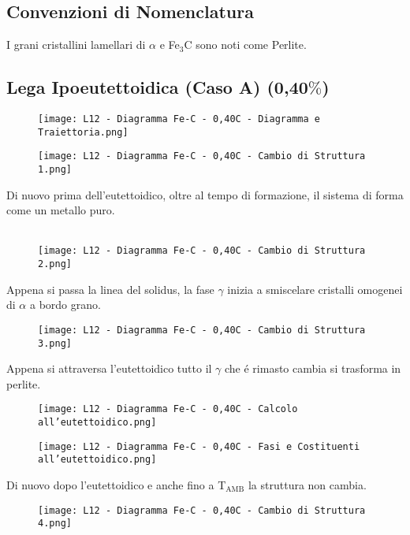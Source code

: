 \documentclass{article}
\begin{document}
{        \subsection{Convenzioni di Nomenclatura}
            I grani cristallini lamellari di $\alpha$ e Fe$_3$C sono noti come Perlite.
        \newpage
        \subsection{Lega Ipoeutettoidica (Caso A) (0,40$\%$)}
            \begin{figure}[h!]
                \centering
                \texttt{[image: L12 - Diagramma Fe-C - 0,40C - Diagramma e Traiettoria.png]}
            \end{figure}
            \begin{figure}[h!]
                \centering
                \texttt{[image: L12 - Diagramma Fe-C - 0,40C - Cambio di Struttura 1.png]}
            \end{figure}
            Di nuovo prima dell'eutettoidico, oltre al tempo di formazione, il sistema di forma come un metallo puro.\\ \\
            \newpage
            \begin{figure}[h!]
                \centering
                \texttt{[image: L12 - Diagramma Fe-C - 0,40C - Cambio di Struttura 2.png]}
            \end{figure}
            Appena si passa la linea del solidus, la fase $\gamma$ inizia a smiscelare cristalli omogenei di $\alpha$ a bordo grano.
            \begin{figure}[h!]
                \centering
                \texttt{[image: L12 - Diagramma Fe-C - 0,40C - Cambio di Struttura 3.png]}
            \end{figure}
            Appena si attraversa l'eutettoidico tutto il $\gamma$ che \'e rimasto cambia si trasforma in perlite.
            \begin{figure}[h!]
                \centering
                \texttt{[image: L12 - Diagramma Fe-C - 0,40C - Calcolo all'eutettoidico.png]}
            \end{figure}
            \begin{figure}[h!]
                \centering
                \texttt{[image: L12 - Diagramma Fe-C - 0,40C - Fasi e Costituenti all'eutettoidico.png]}
            \end{figure}
            Di nuovo dopo l'eutettoidico e anche fino a T$_\text{AMB}$ la struttura non cambia.
            \begin{figure}[h!]
                \centering
                \texttt{[image: L12 - Diagramma Fe-C - 0,40C - Cambio di Struttura 4.png]}
            \end{figure}
}
\end{document}
